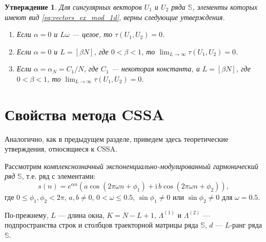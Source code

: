 \documentclass[specialist,
               substylefile = spbu.rtx,
               subf,href,colorlinks=true, 12pt]{disser}
\newcommand{\I}{\mathrm{i}}
\newtheorem{Th}{Утверждение}
\begin{document}
\begin{Th}  \cite[Теорема 1]{Zhornikova2016} \label{th:th_tau_1d}
Для сингулярных векторов $U_1$ и $U_2$  ряда $\mathbb{S}$, элементы которых имеют вид \eqref{eq:vectors_ex_mod_1d}, верны следующие утверждения.
\begin{enumerate}
\item \label{th:re_tau1}
Если $\alpha=0$ и $L\omega$ --- целое, то $\tau(U_1, U_2)=0$.
\item \label{th:re_tau2}
Если $\alpha = 0$ и  $L=[\beta N]$, где $0<\beta<1$, то $\lim_{L \rightarrow \infty}\tau(U_1, U_2) = 0$. 
\item  \label{th:re_tau3}
Если $\alpha = \alpha_N = C_1/N$, где $C_1$ --- некоторая константа, и $L=[\beta N]$, где $0<\beta<1$, то $\lim_{L \rightarrow \infty}\tau(U_1, U_2) = 0$.
\end{enumerate}
\end{Th}

\section{Свойства метода CSSA}
\label{sec:cssa_theory}
Аналогично, как в предыдущем разделе, приведем здесь теоретические утверждения, относящиеся к CSSA.

Рассмотрим \textit{комплекснозначный экспоненциально-модулированный гармонический ряд} $\mathbb{S}$, т.е. ряд с элементами:
\begin{equation} \label{eq:complex_exmodgarm}
 s(n) = e^{\alpha n} (a\cos(2\pi\omega n + \phi_1) + \I \,b\cos(2\pi\omega n + \phi_2)),
\end{equation}
где $0 \leqslant\phi_1, \phi_2 < 2\pi$, $a, b \not = 0$, $0<\omega \leqslant 0.5$, $\sin \phi_1 \not = 0$ или $\sin \phi_2 \not = 0$ для $\omega = 0.5$.

По-прежнему, $L$ --- длина окна, $K=N-L+1$, $\Lambda^{(1)}$ и $\Lambda^{(2)}$ --- подпространства строк и столбцов траекторной матрицы ряда $\mathbb{S}$, $d$ --- $L$-ранг ряда $\mathbb{S}$.

\end{document}
